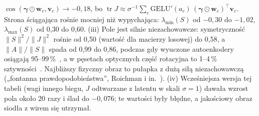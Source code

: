 \documentclass[a4paper,11pt]{article}
\newcommand{\GELU}{\mathrm{GELU}}
\begin{document}
$\cos(\bm\gamma\odot\bm w_c,\bm v_c)\to-0{,}18$, bo $\operatorname{tr}J\approx\sigma^{-1}\sum_c\GELU'(a_c)\,(\bm\gamma\odot\bm w_c)^{\!\top}\bm v_c$.
Strona ściągająca rośnie mocniej niż wypychająca: $\lambda_{\min}(S)$ od $-0{,}30$ do $-1{,}02$, $\lambda_{\max}(S)$ od 0{,}30 do 0{,}60.
(iii) Pole jest silnie niezachowawcze: symetryczność $\lVert S\rVert^2/\lVert J\rVert^2$ rośnie od 0{,}50 (wartość dla macierzy losowej)
do 0{,}58, a $\lVert A\rVert/\lVert S\rVert$ spada od 0{,}99 do 0{,}86, podczas gdy wyuczone autoenkodery osiągają 95--99\,\%~\cite{im16},
a w pęsetach optycznych część rotacyjna to 1--4\,\% sztywności~\cite{pesce09}. Najbliższy fizyczny obraz to pułapka z dużą siłą
niezachowawczą („fontanna prawdopodobieństwa”, Roichman i in.~\cite{roichman08}). (iv) Wcześniejsza wersja tej tabeli (wagi innego
biegu, $J$ odtwarzane z latentu w skali $\sigma=1$) dawała wzrost pola około 20 razy i ślad do $-0{,}076$; te wartości były błędne,
a jakościowy obraz siodła z wirem się utrzymał.
\end{document}
